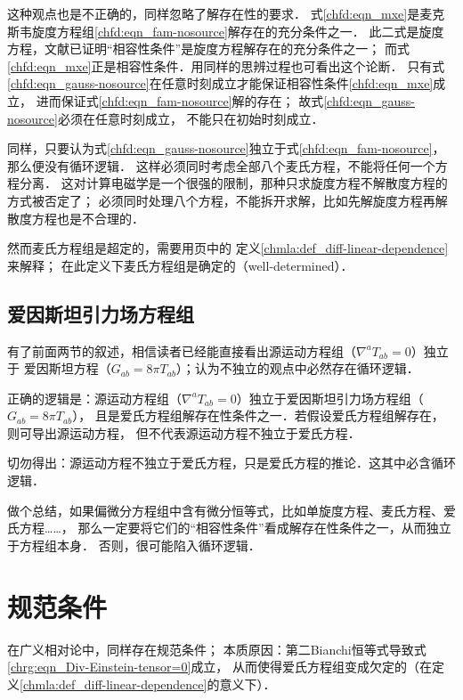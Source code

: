 这种观点也是不正确的，同样忽略了解存在性的要求．
式\eqref{chfd:eqn_mxe}是麦克斯韦旋度方程组\eqref{chfd:eqn_fam-nosource}解存在的充分条件之一．
此二式是旋度方程，文献\parencite{aramaki-2014}已证明“相容性条件”是旋度方程解存在的充分条件之一；
而式\eqref{chfd:eqn_mxe}正是相容性条件．用同样的思辨过程也可看出这个论断．
只有式\eqref{chfd:eqn_gauss-nosource}在任意时刻成立才能保证相容性条件\eqref{chfd:eqn_mxe}成立，
进而保证式\eqref{chfd:eqn_fam-nosource}解的存在；
故式\eqref{chfd:eqn_gauss-nosource}必须在任意时刻成立，
不能只在初始时刻成立．


同样，只要认为式\eqref{chfd:eqn_gauss-nosource}独立于式\eqref{chfd:eqn_fam-nosource}，那么便没有循环逻辑．
这样必须同时考虑全部八个麦氏方程，不能将任何一个方程分离．
这对计算电磁学是一个很强的限制，那种只求旋度方程不解散度方程的方式被否定了；
必须同时处理八个方程，不能拆开求解，比如先解旋度方程再解散度方程也是不合理的．


然而麦氏方程组是超定的，需要用\pageref{chmla:def_diff-linear-dependence}页中的
定义\ref{chmla:def_diff-linear-dependence}来解释；
在此定义下麦氏方程组是确定的（well-determined）．

\subsection{爱因斯坦引力场方程组}
有了前面两节的叙述，相信读者已经能直接看出源运动方程组（$\nabla^a T_{ab}=0$）独立于
爱因斯坦方程（$G_{ab}=8\pi T_{ab}$）；认为不独立的观点中必然存在循环逻辑．

正确的逻辑是：源运动方程组（$\nabla^a T_{ab}=0$）独立于爱因斯坦引力场方程组（$G_{ab}=8\pi T_{ab}$），
且是爱氏方程组解存在性条件之一．若假设爱氏方程组解存在，则可导出源运动方程，
但不代表源运动方程不独立于爱氏方程．

切勿得出：源运动方程不独立于爱氏方程，只是爱氏方程的推论．这其中必含循环逻辑．

做个总结，如果偏微分方程组中含有微分恒等式，比如单旋度方程、麦氏方程、爱氏方程……，
那么一定要将它们的“相容性条件”看成解存在性条件之一，从而独立于方程组本身．
否则，很可能陷入循环逻辑．




\section{规范条件}
在广义相对论中，同样存在规范条件；
本质原因：第二Bianchi恒等式导致式\eqref{chrg:eqn_Div-Einstein-tensor=0}成立，
从而使得爱氏方程组变成欠定的（在定义\ref{chmla:def_diff-linear-dependence}的意义下）．

